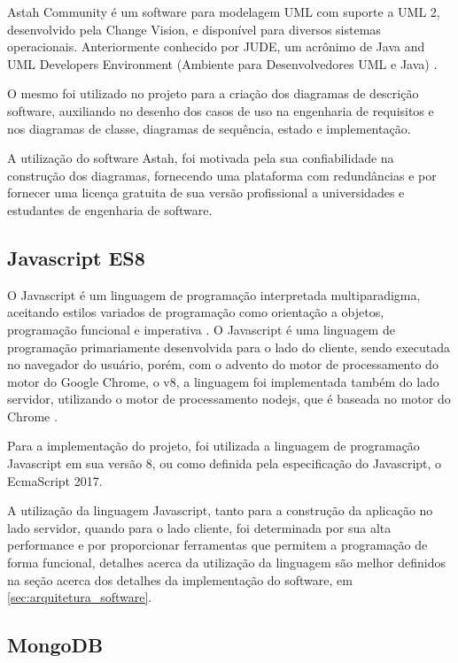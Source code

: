 Astah Community é um software para modelagem UML com suporte a UML 2, desenvolvido pela Change Vision, e disponível para diversos sistemas operacionais. Anteriormente conhecido por JUDE, um acrônimo de Java and UML Developers Environment (Ambiente para Desenvolvedores UML e Java) \cite{astah_uml}.

O mesmo foi utilizado no projeto para a criação dos diagramas de descrição software, auxiliando no desenho dos casos de uso na engenharia de requisitos e nos diagramas de classe, diagramas de sequência, estado e implementação.

A utilização do software Astah, foi motivada pela sua confiabilidade na construção dos diagramas, fornecendo uma plataforma com redundâncias e por fornecer uma licença gratuita de sua versão profissional a universidades e estudantes de engenharia de software.

\subsection{Javascript ES8}

O Javascript é um linguagem de programação interpretada multiparadigma, aceitando estilos variados de programação como orientação a objetos, programação funcional e imperativa \cite{mozilla_javascript}. O Javascript é uma linguagem de programação primariamente desenvolvida para o lado do cliente, sendo executada no navegador do usuário, porém, com o advento do motor de processamento do motor do Google Chrome, o v8, a linguagem foi implementada também do lado servidor, utilizando o motor de processamento nodejs, que é baseada no motor do Chrome \cite{nodejs_about}.

Para a implementação do projeto, foi utilizada a linguagem de programação Javascript em sua versão 8, ou como definida pela especificação do Javascript, o EcmaScript 2017.

A utilização da linguagem Javascript, tanto para a construção da aplicação no lado servidor, quando para o lado cliente, foi determinada por sua alta performance e por proporcionar ferramentas que permitem a programação de forma funcional, detalhes acerca da utilização da linguagem são melhor definidos na seção acerca dos detalhes da implementação do software, em \ref{sec:arquitetura_software}.

\subsection{MongoDB}

